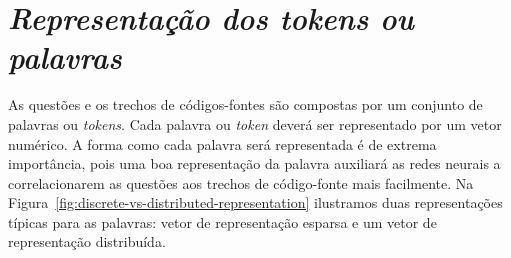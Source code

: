 \section{\textit{Representação dos \textit{tokens} ou palavras}}
\label{sec:fundamentao-representacao-tokens-palavras}

As questões e os trechos de códigos-fontes são compostas por um conjunto de palavras ou \textit{tokens}. Cada palavra ou \textit{token} deverá ser representado por um vetor numérico. A forma como cada palavra será representada é de extrema importância, pois uma boa representação da palavra auxiliará as redes neurais a correlacionarem as questões aos trechos de código-fonte mais facilmente. Na Figura~\ref{fig:discrete-vs-distributed-representation} ilustramos duas representações típicas para as palavras: vetor de representação esparsa e um vetor de representação distribuída.


